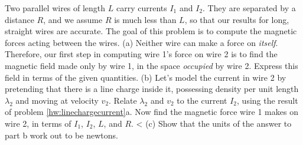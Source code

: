         Two parallel wires of length $L$ carry currents $I_1$ and $I_2$. They are separated
        by a distance $R$, and we assume $R$ is much less than $L$, so that our
        results for long, straight wires are accurate. The goal of this
        problem is to compute the magnetic forces acting between the wires.\hwendpart
        (a) Neither wire can make a force on \emph{itself}.
        Therefore, our first step in computing wire 1's force on wire 2
        is to find the magnetic
        field made only by wire 1, in the space \emph{occupied} by wire 2.
        Express this field in terms of the given quantities.\answercheck\hwendpart
        (b) Let's model the current in wire 2 by pretending that there is a
         line charge inside it, possessing density per unit length $\lambda_2$
         and moving at velocity $v_2$. 
        Relate $\lambda_2$ and $v_2$ to the current $I_2$, using the result of problem
        \ref{hw:linechargecurrent}a.
        Now find the magnetic force wire 1 makes on wire 2, in terms of
        $I_1$, $I_2$, $L$, and $R$. <%
        (c) Show that the units of the answer to part b work out to be newtons.
